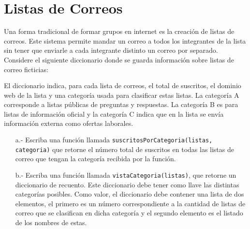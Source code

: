 \section{Listas de Correos}

Una forma tradicional de formar grupos en internet es la creación de listas de correos.
Este sistema permite mandar un correo a todos los integrantes de la lista sin tener que enviarle a cada integrante distinto un correo por separado.
Considere el siguiente diccionario donde se guarda información sobre listas de correo ficticias:
  
  
El diccionario indica, para cada lista de correos, el total de suscritos, el dominio web de la lista y una categoría usada para clasificar estas listas.
La categoría A corresponde a listas públicas de preguntas y respuestas.
La categoría B es para listas de información oficial y la categoría C indica que en la lista se envía información externa como ofertas laborales.
  
\begin{itemize}
    \item[a.-] Escriba una función llamada \texttt{suscritosPorCategoria(listas, categoria)} que retorne el número total de suscritos en todas las listas de correo que tengan la categoría recibida por la función.

    \item[b.-] Escriba una función llamada \texttt{vistaCategoria(listas)}, que retorne un diccionario de recuento. Este diccionario debe tener como llave las distintas categorías posibles. Como valor, el diccionario debe contener una lista de dos elementos, el primero es un número correspondiente a la cantidad de listas de correo que se clasifican en dicha categoría y el segundo elemento es el listado de los nombres de estas.
\end{itemize}
